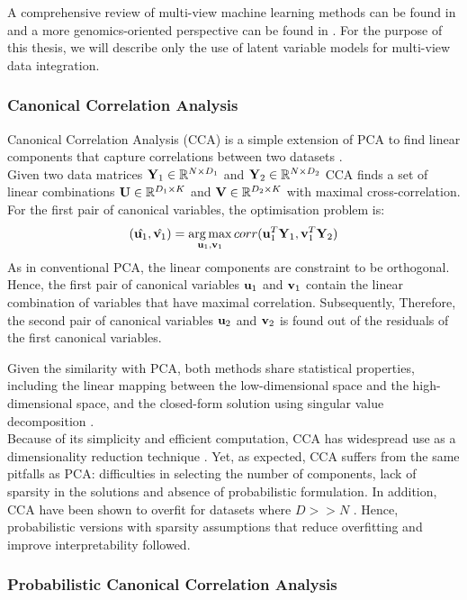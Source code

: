 A comprehensive review of multi-view machine learning methods can be found in \cite{Xu2013} and a more genomics-oriented perspective can be found in \cite{Ritchie2015}. For the purpose of this thesis, we will describe only the use of latent variable models for multi-view data integration.

\subsubsection{Canonical Correlation Analysis} \label{cca}
Canonical Correlation Analysis (CCA) is a simple extension of PCA to find linear components that capture correlations between two datasets \cite{Hotteling1936,Hardle2007}.\\
Given two data matrices ${\bf Y}_1 \in \mathbb{R}^{N \times D_1}$ and ${\bf Y}_2 \in \mathbb{R}^{N \times D_2}$ CCA finds a set of linear combinations ${\bf U} \in \mathbb{R}^{D_1 \times K}$ and ${\bf V} \in \mathbb{R}^{D_2 \times K}$ with maximal cross-correlation.
For the first pair of canonical variables, the optimisation problem is:
\[
	(\hat{{\bf u}_1}, \hat{{\bf v}_1}) = \operatorname*{arg\,max}_{{\bf u}_1,{\bf v}_1} corr({\bf u}_{1}^T {\bf Y}_1, {\bf v}_{1}^T {\bf Y}_2)
\]
As in conventional PCA, the linear components are constraint to be orthogonal. Hence, the first pair of canonical variables ${\bf u}_1$ and ${\bf v}_1$ contain the linear combination of variables that have maximal correlation. Subsequently, Therefore, the second pair of canonical variables ${\bf u}_2$ and ${\bf v}_2$ is found out of the residuals of the first canonical variables.

Given the similarity with PCA, both methods share statistical properties, including the linear mapping between the low-dimensional space and the high-dimensional space, and the closed-form solution using singular value decomposition \cite{Hotteling1936,Hardle2007}.\\
Because of its simplicity and efficient computation, CCA has widespread use as a dimensionality reduction technique \cite{Hardle2007}. Yet, as expected, CCA suffers from the same pitfalls as PCA: difficulties in selecting the number of components, lack of sparsity in the solutions and absence of probabilistic formulation. In addition, CCA have been shown to overfit for datasets where $D>>N$ \cite{McCabe2018,Guo2016}. Hence, probabilistic versions with sparsity assumptions that reduce overfitting and improve interpretability followed.


\subsubsection{Probabilistic Canonical Correlation Analysis} \label{section_probabilisticCCA}

